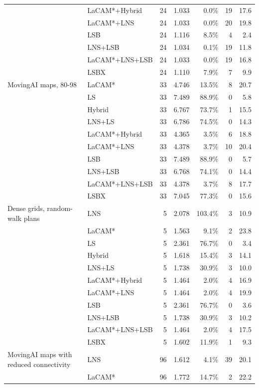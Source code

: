 \begin{table}[t]
\begin{tabular}{llrrrrr}
 & LaCAM*+Hybrid & 24 & 1.033 & 0.0\% & 19 & 17.6\\
 & LaCAM*+LNS & 24 & 1.033 & 0.0\% & 20 & 19.8\\
 & LSB & 24 & 1.116 & 8.5\% & 4 & 2.4\\
 & LNS+LSB & 24 & 1.034 & 0.1\% & 19 & 11.8\\
 & LaCAM*+LNS+LSB & 24 & 1.033 & 0.0\% & 19 & 16.8\\
 & LSBX & 24 & 1.110 & 7.9\% & 7 & 9.9\\
\midrule
MovingAI maps, 80-98%
 & LaCAM* & 33 & 4.746 & 13.5\% & 8 & 20.7\\
 & LS & 33 & 7.489 & 88.9\% & 0 & 5.8\\
 & Hybrid & 33 & 6.767 & 73.7\% & 1 & 15.5\\
 & LNS+LS & 33 & 6.786 & 74.5\% & 0 & 14.3\\
 & LaCAM*+Hybrid & 33 & 4.365 & 3.5\% & 6 & 18.8\\
 & LaCAM*+LNS & 33 & 4.378 & 3.7\% & 10 & 20.4\\
 & LSB & 33 & 7.489 & 88.9\% & 0 & 5.7\\
 & LNS+LSB & 33 & 6.768 & 74.1\% & 0 & 14.4\\
 & LaCAM*+LNS+LSB & 33 & 4.378 & 3.7\% & 8 & 17.7\\
 & LSBX & 33 & 7.045 & 77.3\% & 0 & 15.6\\
\midrule
Dense grids, random-walk plans & LNS & 5 & 2.078 & 103.4\% & 3 & 10.9\\
 & LaCAM* & 5 & 1.563 & 9.1\% & 2 & 23.8\\
 & LS & 5 & 2.361 & 76.7\% & 0 & 3.4\\
 & Hybrid & 5 & 1.618 & 15.4\% & 3 & 14.1\\
 & LNS+LS & 5 & 1.738 & 30.9\% & 3 & 10.0\\
 & LaCAM*+Hybrid & 5 & 1.464 & 2.0\% & 4 & 16.9\\
 & LaCAM*+LNS & 5 & 1.464 & 2.0\% & 4 & 19.9\\
 & LSB & 5 & 2.361 & 76.7\% & 0 & 3.6\\
 & LNS+LSB & 5 & 1.738 & 30.9\% & 3 & 10.2\\
 & LaCAM*+LNS+LSB & 5 & 1.464 & 2.0\% & 4 & 17.5\\
 & LSBX & 5 & 1.602 & 11.9\% & 1 & 9.3\\
\midrule
MovingAI maps with reduced connectivity & LNS & 96 & 1.612 & 4.1\% & 39 & 20.1\\
 & LaCAM* & 96 & 1.772 & 14.7\% & 2 & 22.2\\

\end{tabular}
\end{table}
